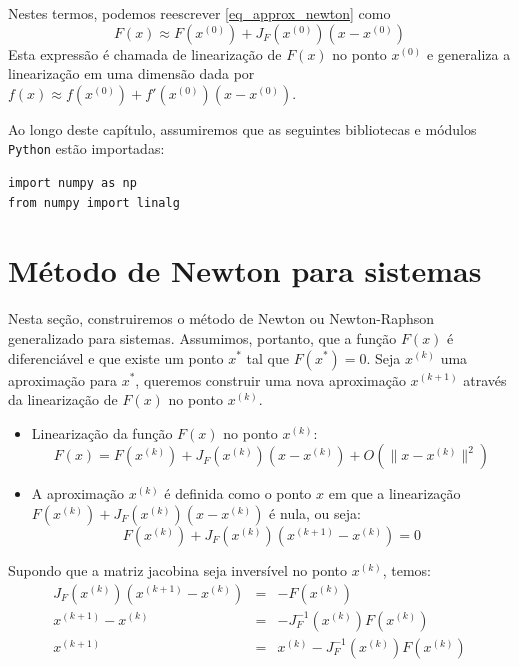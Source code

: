 Nestes termos, podemos reescrever \eqref{eq_approx_newton} como
$$F(x)\approx F(x^{(0)}) + J_F(x^{(0)}) (x-x^{(0)})$$
Esta expressão é chamada de linearização de $F(x)$ no ponto $x^{(0)}$ e generaliza a linearização em uma dimensão dada por $f(x)\approx f(x^{(0)})+f'(x^{(0)}) (x-x^{(0)})$.

\ifispython
Ao longo deste capítulo, assumiremos que as seguintes bibliotecas e módulos \verb+Python+ estão importadas:
\begin{verbatim}
import numpy as np
from numpy import linalg
\end{verbatim}
\fi

\section{Método de  Newton para sistemas}

Nesta seção, construiremos o método de Newton ou Newton-Raphson generalizado para sistemas. Assumimos, portanto, que a função $F(x)$ é diferenciável e que existe um ponto $x^*$ tal que $F(x^*)=0$. Seja $x^{(k)}$ uma aproximação para $x^*$, queremos construir uma nova aproximação $x^{(k+1)}$ através da linearização de $F(x)$ no ponto $x^{(k)}$.

\begin{itemize}
\item Linearização da função $F(x)$ no ponto $x^{(k)}$: 
  \begin{equation*}
F(x)= F(x^{(k)})+ J_F\left(x^{(k)}\right) \left(x-x^{(k)}\right)  + O\left(\|x-x^{(k)}\|^2\right)    
  \end{equation*}
\item A aproximação $x^{(k)}$ é definida como o ponto $x$ em que a linearização $F(x^{(k)})+ J_F\left(x^{(k)}\right) \left(x-x^{(k)}\right)$ é nula, ou seja:
$$F(x^{(k)})+ J_F\left(x^{(k)}\right) \left(x^{(k+1)}-x^{(k)}\right)=0$$
\end{itemize}

Supondo que a matriz jacobina seja inversível no ponto $x^{(k)}$, temos:
\begin{eqnarray*}
J_F\left(x^{(k)}\right) \left(x^{(k+1)}-x^{(k)}\right)&=&-F(x^{(k)})\\
x^{(k+1)}-x^{(k)}&=&-J_F^{-1}\left(x^{(k)}\right)F(x^{(k)})\\
x^{(k+1)}&=&x^{(k)}-J_F^{-1}\left(x^{(k)}\right)F(x^{(k)})
\end{eqnarray*}


